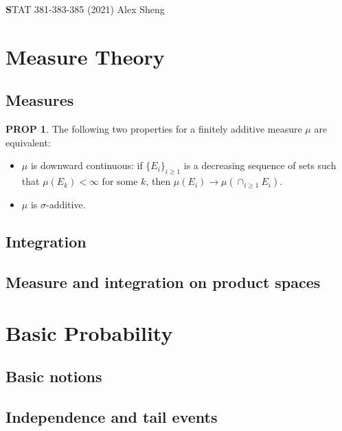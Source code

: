 \documentclass[hidelinks,11pt]{article}
\theoremstyle{definition}
\theoremstyle{dotless}
\newtheorem{prop}{PROP}[section]
\theoremstyle{named}
\theoremstyle{remark}
\DeclareMathOperator{\1}{\mathbf{1}}
\begin{document}
\begin{center}
{\Large\textbf STAT 381-383-385\hspace{0.2cm} (2021)}\medbreak
\large{Alex Sheng}
\end{center}

\vspace{0.2 cm}
\tableofcontents

\newpage
\section{Measure Theory}

\subsection{Measures}

\begin{prop}\label{Prop 1.1}
The following two properties for a finitely additive measure $\mu$ are equivalent:\begin{itemize}
    \item $\mu$ is downward continuous: if $\{E_i\}_{i\geq1}$ is a decreasing sequence of sets such that $\mu(E_k)<\infty$ for some $k$, then $\mu(E_i)\to\mu(\cap_{i\geq1}E_i).$
    \item $\mu$ is $\sigma$-additive.
\end{itemize}
\end{prop}

\subsection{Integration}

\subsection{Measure and integration on product spaces}

\newpage
\section{Basic Probability}

\subsection{Basic notions}

\subsection{Independence and tail events}
\end{document}
